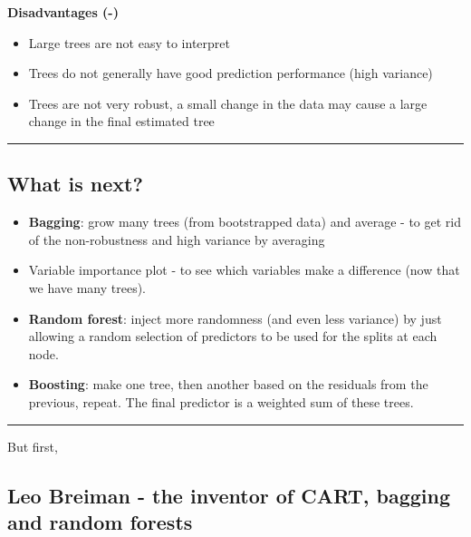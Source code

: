 \documentclass[]{article}
\providecommand{\tightlist}{%
  \setlength{\itemsep}{0pt}\setlength{\parskip}{0pt}}
\begin{document}
\textbf{Disadvantages (-)}

\begin{itemize}
\tightlist
\item
  Large trees are not easy to interpret
\item
  Trees do not generally have good prediction performance (high
  variance)
\item
  Trees are not very robust, a small change in the data may cause a
  large change in the final estimated tree
\end{itemize}

\begin{center}\rule{0.5\linewidth}{\linethickness}\end{center}

\hypertarget{what-is-next}{%
\subsection{What is next?}\label{what-is-next}}

\begin{itemize}
\tightlist
\item
  \textbf{Bagging}: grow many trees (from bootstrapped data) and average
  - to get rid of the non-robustness and high variance by averaging
\item
  Variable importance plot - to see which variables make a difference
  (now that we have many trees).
\item
  \textbf{Random forest}: inject more randomness (and even less
  variance) by just allowing a random selection of predictors to be used
  for the splits at each node.
\item
  \textbf{Boosting}: make one tree, then another based on the residuals
  from the previous, repeat. The final predictor is a weighted sum of
  these trees.
\end{itemize}

\begin{center}\rule{0.5\linewidth}{\linethickness}\end{center}

But first,

\hypertarget{leo-breiman---the-inventor-of-cart-bagging-and-random-forests}{%
\subsection{Leo Breiman - the inventor of CART, bagging and random
forests}\label{leo-breiman---the-inventor-of-cart-bagging-and-random-forests}}
\end{document}
